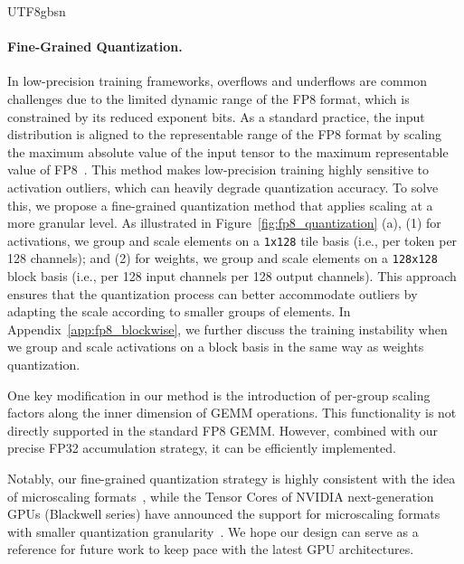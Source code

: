 \documentclass[11pt, a4paper, logo, copyright, nonumbering]{deepseek}
\begin{document}
\begin{CJK*}{UTF8}{gbsn}
\paragraph{Fine-Grained Quantization.}
In low-precision training frameworks, overflows and underflows are common challenges due to the limited dynamic range of the FP8 format, which is constrained by its reduced exponent bits. 
As a standard practice, the input distribution is aligned to the representable range of the FP8 format by scaling the maximum absolute value of the input tensor to the maximum representable value of FP8~\citep{fp16train}. 
This method makes low-precision training highly sensitive to activation outliers, which can heavily degrade quantization accuracy.
To solve this, we propose a fine-grained quantization method that applies scaling at a more granular level. 
As illustrated in Figure~\ref{fig:fp8_quantization} (a), (1) for activations, we group and scale elements on a \texttt{1x128} tile basis (i.e., per token per 128 channels); and (2) for weights, we group and scale elements on a \texttt{128x128} block basis (i.e., per 128 input channels per 128 output channels).
This approach ensures that the quantization process can better accommodate outliers by adapting the scale according to smaller groups of elements. 
In Appendix~\ref{app:fp8_blockwise}, we further discuss the training instability when we group and scale activations on a block basis in the same way as weights quantization.

One key modification in our method is the introduction of per-group scaling factors along the inner dimension of GEMM operations. 
This functionality is not directly supported in the standard FP8 GEMM. 
However, combined with our precise FP32 accumulation strategy, it can be efficiently implemented. 

Notably, our fine-grained quantization strategy is highly consistent with the idea of microscaling formats~\citep{rouhani2023microscaling}, while the Tensor Cores of NVIDIA next-generation GPUs (Blackwell series) have announced the support for microscaling formats with smaller quantization granularity~\citep{nvidia_tensor_cores}. 
We hope our design can serve as a reference for future work to keep pace with the latest GPU architectures.


\end{CJK*}
\end{document}
